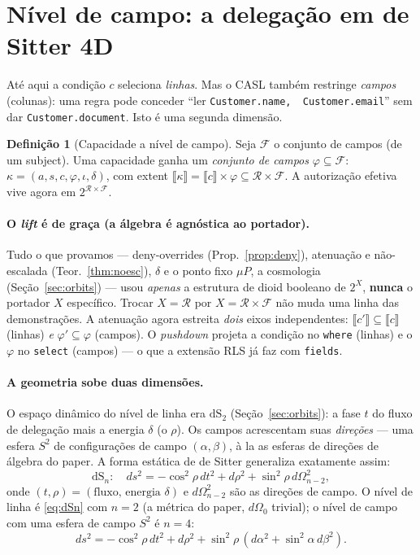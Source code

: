 \documentclass[11pt,a4paper]{article}
\theoremstyle{definition}
\newtheorem{definition}[theorem]{Definição}
\newcommand{\R}{\mathcal{R}}
\newcommand{\ext}[1]{\llbracket #1 \rrbracket}
\newcommand{\dep}{\delta}
\newcommand{\F}{\mathcal{F}}
\newcommand{\dS}{\mathrm{dS}}
\begin{document}
  \section{Nível de campo: a delegação em de Sitter 4D}\label{sec:field}

  Até aqui a condição $c$ seleciona \emph{linhas}. Mas o CASL também restringe
  \emph{campos} (colunas): uma regra pode conceder ``ler \texttt{Customer.name,
  \,Customer.email}'' sem dar \texttt{Customer.document}. Isto é uma segunda
  dimensão.

  \begin{definition}[Capacidade a nível de campo]
  Seja $\F$ o conjunto de campos (de um subject). Uma capacidade ganha um
  \emph{conjunto de campos} $\varphi\subseteq\F$:
  $\kappa=(a,s,c,\varphi,\iota,\dep)$, com extent
  $\ext{\kappa}=\ext{c}\times\varphi\subseteq\R\times\F$. A autorização efetiva
  vive agora em $2^{\R\times\F}$.
  \end{definition}

  \paragraph{O \emph{lift} é de graça (a álgebra é agnóstica ao portador).} Tudo
  o que provamos --- deny-overrides (Prop.~\ref{prop:deny}), atenuação e
  não-escalada (Teor.~\ref{thm:noesc}), $\dep$ e o ponto fixo $\mu P$, a
  cosmologia (Seção~\ref{sec:orbits}) --- usou \emph{apenas} a estrutura de
  dioid booleano de $2^{X}$, \textbf{nunca} o portador $X$ específico. Trocar
  $X=\R$ por $X=\R\times\F$ não muda uma linha das demonstrações. A atenuação
  agora estreita \emph{dois} eixos independentes: $\ext{c'}\subseteq\ext{c}$
  (linhas) \emph{e} $\varphi'\subseteq\varphi$ (campos). O \emph{pushdown}
  projeta a condição no \texttt{where} (linhas) e o $\varphi$ no \texttt{select}
  (campos) --- o que a extensão RLS já faz com \texttt{fields}.

  \paragraph{A geometria sobe duas dimensões.} O espaço dinâmico do nível de
  linha era $\dS_2$ (Seção~\ref{sec:orbits}): a fase $t$ do fluxo de delegação
  mais a energia $\dep$ (o $\rho$). Os campos acrescentam suas \emph{direções}
  --- uma esfera $S^2$ de configurações de campo $(\alpha,\beta)$, à la as
  esferas de direções de álgebra do paper. A forma estática de de Sitter
  generaliza exatamente assim:
  \begin{equation}
    \dS_n:\quad ds^2=-\cos^2\!\rho\,dt^2+d\rho^2+\sin^2\!\rho\,d\Omega^2_{n-2},
    \label{eq:dSn}
  \end{equation}
  onde $(t,\rho)=(\text{fluxo, energia }\dep)$ e $d\Omega^2_{n-2}$ são as
  direções de campo. O nível de linha é \eqref{eq:dSn} com $n=2$ (a métrica do
  paper, $d\Omega_0$ trivial); o nível de campo com uma esfera de campo $S^2$ é
  $n=4$:
  \[
    ds^2=-\cos^2\!\rho\,dt^2+d\rho^2+\sin^2\!\rho\,(d\alpha^2+\sin^2\!\alpha\,d\beta^2).
  \]
\end{document}
